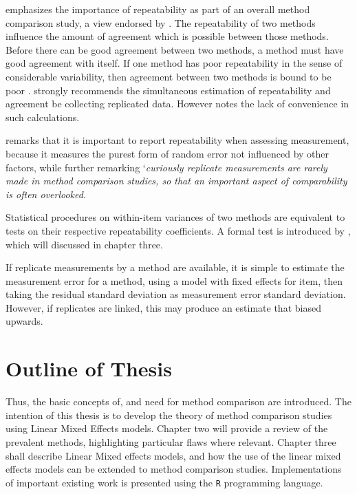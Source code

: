 \documentclass[12pt, a4paper]{report}
\theoremstyle{plain}
\theoremstyle{definition}
\theoremstyle{remark}
\begin{document}


\citet{Barnhart} emphasizes the importance of repeatability as part of an overall method comparison study, a view endorsed by \citet{BXC2008}. The repeatability of two methods influence the amount of agreement which is possible between those methods. Before there can be good agreement between two methods, a method must have good agreement with itself. If one method has poor repeatability in the sense of considerable variability, then agreement between two methods is bound to be poor \citep{BA99, ARoy2009}.
\citet{BA99} strongly recommends the simultaneous estimation of repeatability and agreement be collecting replicated data.
However \citet{ARoy2009} notes the lack of convenience in such calculations. 

% 

	

	\citet{Barnhart} remarks that it is important to report repeatability when assessing
	measurement, because it measures the purest form of random error
	not influenced by other factors, while further remarking `\textit{curiously replicate measurements are rarely made in method comparison studies, so that an important aspect of comparability is often overlooked}. 
	
	
		
Statistical procedures on within-item variances of two methods are equivalent to tests on their respective repeatability coefficients. A formal test is introduced by \citet{ARoy2009}, which will discussed in chapter three.
		
	
	If replicate measurements by a method are available, it is simple to estimate the measurement error for a method, using a model with fixed effects for item, then taking the residual standard deviation as measurement error standard deviation. However, if replicates are linked, this may produce an estimate that biased upwards.
	

	

	\section{Outline of Thesis}
	Thus, the basic concepts of, and need for method comparison are introduced. The intention of this thesis is to develop the theory of method comparison studies using Linear Mixed Effects models. Chapter two will provide a review of the prevalent methods, highlighting particular flaws where relevant. Chapter three shall describe Linear Mixed effects models, and how the use of the linear mixed
	effects models can be extended to method comparison studies. Implementations of important existing work is presented using the \texttt{R} programming language.
	
\end{document}
